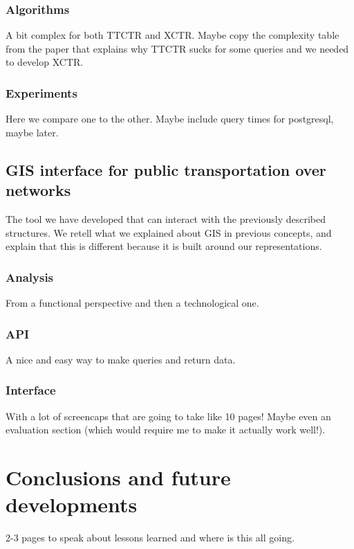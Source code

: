 \documentclass{UniVieCS_PhD} %
\begin{document}
	\subsubsection{Algorithms}
	A bit complex for both TTCTR and XCTR. Maybe copy the complexity table from the paper that explains why TTCTR sucks for some queries and we needed to develop XCTR.
	
	\subsubsection{Experiments}
	Here we compare one to the other. Maybe include query times for postgresql, maybe later.
	
	\subsection{GIS interface for public transportation over networks}
	The tool we have developed that can interact with the previously described structures. We retell what we explained about GIS in previous concepts, and explain that this is different because it is built around our representations.
	
	\subsubsection{Analysis}
	From a functional perspective and then a technological one.
	
	\subsubsection{API}
	A nice and easy way to make queries and return data.
	
	\subsubsection{Interface}
	With a lot of screencaps that are going to take like 10 pages! Maybe even an evaluation section (which would require me to make it actually work well!).
	
	\section{ Conclusions and future developments}
	2-3 pages to speak about lessons learned and where is this all going.
	
	\pagebreak
	
	
	
	
\end{document}

